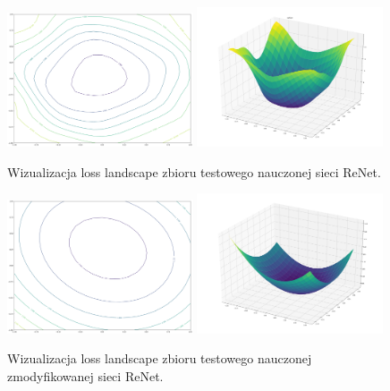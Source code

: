 \documentclass[oneside, mag]{mgr}
\begin{document}
\begin{figure}
\centering
	\includegraphics[width=0.49\textwidth]{img/loss_ReNet.png}
	\includegraphics[width=0.49\textwidth]{img/loss_3d_ReNet.png}
	\caption{Wizualizacja loss landscape zbioru testowego nauczonej sieci ReNet.}
	\label{fig:loss_ReNet}
\end{figure}

\begin{figure}
\centering
	\includegraphics[width=0.49\textwidth]{img/loss_modif_ReNet.png}
	\includegraphics[width=0.49\textwidth]{img/loss_3d_modif_ReNet.png}
	\caption{Wizualizacja loss landscape zbioru testowego nauczonej zmodyfikowanej sieci ReNet.}
	\label{fig:loss_modif_ReNet}
\end{figure}
\end{document}
